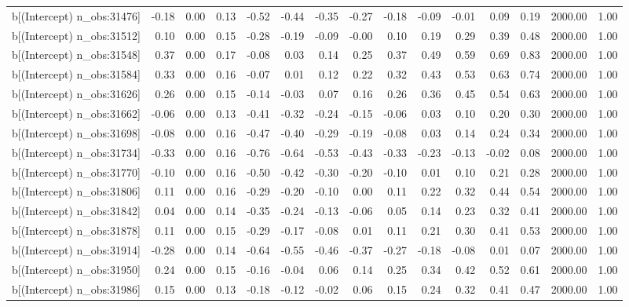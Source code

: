 \begin{table}[ht]
\begin{tabular}{rrrrrrrrrrrrrrr}
  b[(Intercept) n\_obs:31476] & -0.18 & 0.00 & 0.13 & -0.52 & -0.44 & -0.35 & -0.27 & -0.18 & -0.09 & -0.01 & 0.09 & 0.19 & 2000.00 & 1.00 \\ 
  b[(Intercept) n\_obs:31512] & 0.10 & 0.00 & 0.15 & -0.28 & -0.19 & -0.09 & -0.00 & 0.10 & 0.19 & 0.29 & 0.39 & 0.48 & 2000.00 & 1.00 \\ 
  b[(Intercept) n\_obs:31548] & 0.37 & 0.00 & 0.17 & -0.08 & 0.03 & 0.14 & 0.25 & 0.37 & 0.49 & 0.59 & 0.69 & 0.83 & 2000.00 & 1.00 \\ 
  b[(Intercept) n\_obs:31584] & 0.33 & 0.00 & 0.16 & -0.07 & 0.01 & 0.12 & 0.22 & 0.32 & 0.43 & 0.53 & 0.63 & 0.74 & 2000.00 & 1.00 \\ 
  b[(Intercept) n\_obs:31626] & 0.26 & 0.00 & 0.15 & -0.14 & -0.03 & 0.07 & 0.16 & 0.26 & 0.36 & 0.45 & 0.54 & 0.63 & 2000.00 & 1.00 \\ 
  b[(Intercept) n\_obs:31662] & -0.06 & 0.00 & 0.13 & -0.41 & -0.32 & -0.24 & -0.15 & -0.06 & 0.03 & 0.10 & 0.20 & 0.30 & 2000.00 & 1.00 \\ 
  b[(Intercept) n\_obs:31698] & -0.08 & 0.00 & 0.16 & -0.47 & -0.40 & -0.29 & -0.19 & -0.08 & 0.03 & 0.14 & 0.24 & 0.34 & 2000.00 & 1.00 \\ 
  b[(Intercept) n\_obs:31734] & -0.33 & 0.00 & 0.16 & -0.76 & -0.64 & -0.53 & -0.43 & -0.33 & -0.23 & -0.13 & -0.02 & 0.08 & 2000.00 & 1.00 \\ 
  b[(Intercept) n\_obs:31770] & -0.10 & 0.00 & 0.16 & -0.50 & -0.42 & -0.30 & -0.20 & -0.10 & 0.01 & 0.10 & 0.21 & 0.28 & 2000.00 & 1.00 \\ 
  b[(Intercept) n\_obs:31806] & 0.11 & 0.00 & 0.16 & -0.29 & -0.20 & -0.10 & 0.00 & 0.11 & 0.22 & 0.32 & 0.44 & 0.54 & 2000.00 & 1.00 \\ 
  b[(Intercept) n\_obs:31842] & 0.04 & 0.00 & 0.14 & -0.35 & -0.24 & -0.13 & -0.06 & 0.05 & 0.14 & 0.23 & 0.32 & 0.41 & 2000.00 & 1.00 \\ 
  b[(Intercept) n\_obs:31878] & 0.11 & 0.00 & 0.15 & -0.29 & -0.17 & -0.08 & 0.01 & 0.11 & 0.21 & 0.30 & 0.41 & 0.53 & 2000.00 & 1.00 \\ 
  b[(Intercept) n\_obs:31914] & -0.28 & 0.00 & 0.14 & -0.64 & -0.55 & -0.46 & -0.37 & -0.27 & -0.18 & -0.08 & 0.01 & 0.07 & 2000.00 & 1.00 \\ 
  b[(Intercept) n\_obs:31950] & 0.24 & 0.00 & 0.15 & -0.16 & -0.04 & 0.06 & 0.14 & 0.25 & 0.34 & 0.42 & 0.52 & 0.61 & 2000.00 & 1.00 \\ 
  b[(Intercept) n\_obs:31986] & 0.15 & 0.00 & 0.13 & -0.18 & -0.12 & -0.02 & 0.06 & 0.15 & 0.24 & 0.32 & 0.41 & 0.47 & 2000.00 & 1.00 \\ 

\end{tabular}
\end{table}
